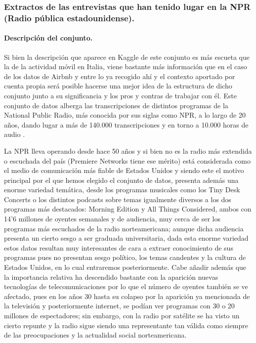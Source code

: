 \documentclass[11pt, a4paper]{article} %
\begin{document}
\subsubsection{Extractos de las entrevistas que han tenido lugar en la NPR (Radio pública estadounidense).}
\paragraph{Descripción del conjunto.}
Si bien la descripción que aparece en Kaggle de este conjunto es más escueta que la de la actividad móvil en Italia, viene bastante más información que en el caso de los datos de Airbnb y entre lo ya recogido ahí y el contexto aportado por cuenta propia será posible hacerse una mejor idea de la estructura de dicho conjunto junto a su significancia y los pros y contras de trabajar con él. Este conjunto de datos alberga las transcripciones de distintos programas de la National Public Radio, más conocida por sus siglas como NPR, a lo largo de 20 años, dando lugar a más de 140.000 transcripciones y en torno a 10.000 horas de audio \cite{npr}.


La NPR lleva operando desde hace 50 años y si bien no es la radio más extendida o escuchada del país (Premiere Networks tiene ese mérito) está considerada como el medio de comunicación más fiable de Estados Unidos y siendo este el motivo principal por el que hemos elegido el conjunto de datos, presenta además una enorme variedad temática, desde los programas musicales como los Tiny Desk Concerts o los distintos podcasts sobre temas igualmente diversos a los dos programas más destacados: Morning Edition y All Things Considered, ambos con 14'6 millones de oyentes semanales y de audiencia, muy cerca de ser los programas más escuchados de la radio norteamericana; aunque dicha audiencia presenta un cierto sesgo a ser graduada universitaria, dada esta enorme variedad estos datos resultan muy interesantes de cara a extraer conocimiento de sus programas pues no presentan sesgo político, los temas candentes y la cultura de Estados Unidos, en lo cual entraremos posteriormente. Cabe añadir además que la importancia relativa ha descendido bastante con la aparición nuevas tecnologías de telecomunicaciones por lo que el número de oyentes también se ve afectado, pues en los años 30 hasta su colapso por la aparición ya mencionada de la televisión y posteriormente internet, se podían ver programas con 30 o 20 millones de espectadores; sin embargo, con la radio por satélite se ha visto un cierto repunte y la radio sigue siendo una representante tan válida como siempre de las preocupaciones y la actualidad social norteamericana.
\end{document}
